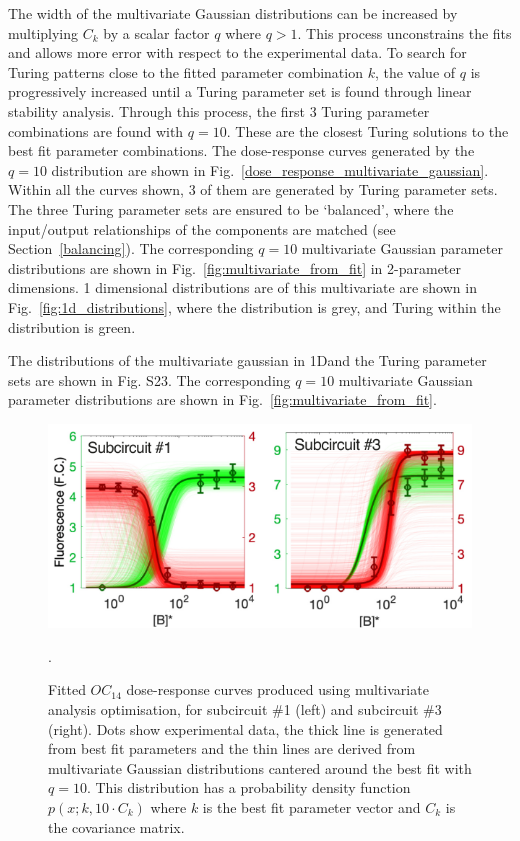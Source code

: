 The width of the multivariate Gaussian distributions can be increased by multiplying $C_k$ by a scalar factor $q$ where $q>1$.
This process unconstrains the fits and allows more error with respect to the experimental data.
To search for Turing patterns close to the fitted parameter combination $k$, the value of $q$ is progressively increased until a Turing parameter set is found through linear stability analysis.
Through this process, the first 3 Turing parameter combinations are found with $q=10$.
These are the closest Turing solutions to the best fit parameter combinations.
The dose-response curves generated by the $q=10$ distribution are shown in Fig.~\ref{dose_response_multivariate_gaussian}.
Within all the curves shown, 3 of them are generated by Turing parameter sets.
The three Turing parameter sets are ensured to be ‘balanced’, where the input/output relationships of the components are matched (see Section~\ref{balancing}).
The corresponding $q=10$ multivariate Gaussian parameter distributions are shown in Fig.~\ref{fig:multivariate_from_fit} in 2-parameter dimensions.
1 dimensional distributions are of this multivariate are shown in Fig.~\ref{fig:1d_distributions}, where the distribution is grey, and Turing within the distribution is green.

The distributions of the multivariate gaussian in 1Dand the Turing parameter sets are shown in Fig. S23.
The corresponding $q=10$ multivariate Gaussian parameter distributions are shown in Fig.~\ref{fig:multivariate_from_fit}.
\begin{figure}[H] %
    \centering
    \begin{adjustbox}{center}
        \includegraphics[width=1\textwidth]{chapters/Chapter 2/dose_response_multivariate_gaussian} %
    \end{adjustbox}
    \caption{Fitted $OC_14$ dose-response curves produced using multivariate analysis optimisation, for subcircuit \#1 (left) and subcircuit \#3 (right). Dots show experimental data, the thick line is generated from best fit parameters and the thin lines are derived from multivariate Gaussian distributions cantered around the best fit with $q=10$. This distribution has a probability density function $p(x;k,10\cdot C_{k})$ where $k$ is the best fit parameter vector and $C_{k}$ is the covariance matrix.}.
    \label{fig:dose_response_multivariate_gaussian} %
\end{figure}


